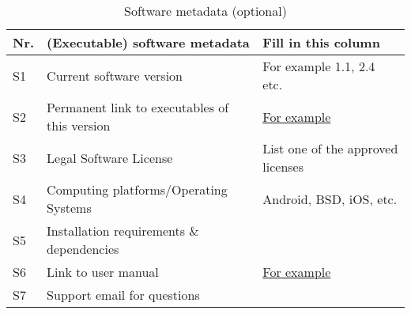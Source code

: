 \begin{table}
\begin{tabular}{lll}
\hline
\textbf{Nr.} & \textbf{(Executable) software metadata} & \textbf{Fill in this column} \\
\hline
S1 & Current software version & For example 1.1, 2.4 etc. \\
\hline
S2 & Permanent link to executables of this version  & \href{https://github.com/combogenomics/$ $DuctApe/releases/tag/DuctApe-0.16.4}{For example} \\
\hline
S3 & Legal Software License & List one of the approved licenses \\
\hline
S4 & Computing platforms/Operating Systems & Android, BSD, iOS, etc.  \\
\hline
S5 & Installation requirements \& dependencies & \\
\hline
S6 & Link to user manual  & \href{http://mozart.github.io/documentation}{For example} \\
\hline
S7 & Support email for questions & \\
\hline
\end{tabular}
\caption{Software metadata (optional)}
\end{table}